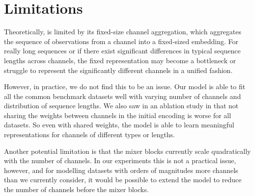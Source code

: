 \section{Limitations}
Theoretically, \model{} is limited by its fixed-size channel aggregation, which aggregates the sequence of observations from a channel into a fixed-sized embedding.
For really long sequences or if there exist significant differences in typical sequence lengths across channels, the fixed representation may become a bottleneck or struggle to represent the significantly different channels in a unified fashion.

However, in practice, we do not find this to be an issue.
Our model is able to fit all the common benchmark datasets well with varying number of channels and distribution of sequence lengths.
We also saw in an ablation study in  that not sharing the weights between channels in the initial encoding is worse for all datasets. 
So even with shared weights, the model is able to learn meaningful representations for channels of different types or lengths.

Another potential limitation is that the mixer blocks currently scale quadratically with the number of channels. 
In our experiments this is not a practical issue, however, and for modelling datasets with orders of magnitudes more channels than we currently consider, it would be possible to extend the model to reduce the number of channels before the mixer blocks.